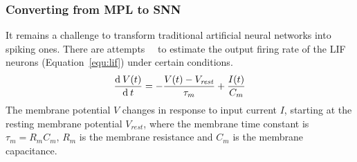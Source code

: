 
\subsubsection{Converting from MPL to SNN}
It remains a challenge to transform traditional artificial neural networks into spiking ones.
There are attempts~\cite{la2008response}~\cite{burkitt2006review} to estimate the output firing rate of the LIF neurons (Equation~\ref{equ:lif}) under certain conditions. 
\begin{equation}
\frac{\mathrm{d} \: V(t)}{\mathrm{d}\:  t}=-\frac{V(t)-V_\mathit{rest}}{\tau_m}+\frac{I(t)}{C_m}
\label{equ:lif}
\end{equation}
The membrane potential $V$ changes in response to input current $I$, starting at the resting membrane potential  $V_{rest}$, where the membrane time constant is $\tau_m = R_mC_m$, $R_m$ is the membrane resistance and $C_m$ is the membrane capacitance.

